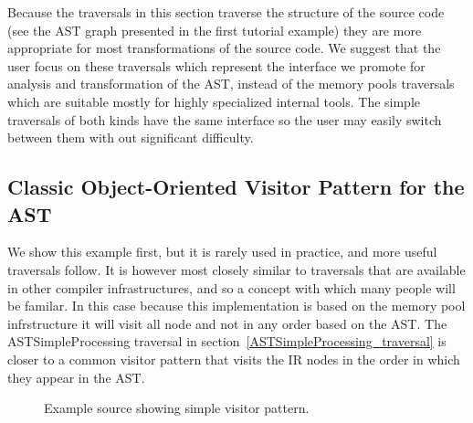    Because the traversals in this section traverse the structure of
the source code (see the AST graph presented in the first tutorial 
example) they are more appropriate for most transformations
of the source code.  We suggest that the user focus on these 
traversals which represent the interface we promote for analysis
and transformation of the AST, instead of the memory pools traversals
which are suitable mostly for highly specialized internal tools.
The simple traversals of both kinds have the same interface so the user may
easily switch between them with out significant difficulty.

\subsection{Classic Object-Oriented Visitor Pattern for the AST}

   We show this example first, but it is rarely used in practice, and
more useful traversals follow.  It is however most closely similar to
traversals that are available in other compiler infrastructures, and so
a concept with which many people will be familar.  In this case because
this implementation is based on the memory pool infrstructure it will
visit all node and not in any order based on the AST.  The ASTSimpleProcessing
traversal in section~\ref{ASTSimpleProcessing_traversal} is closer to a common 
visitor pattern that visits the IR nodes in the order in which they appear in 
the AST.

\begin{figure}[!h]
{\indent
{\mySmallFontSize

\begin{latexonly}
   
\end{latexonly}

\begin{htmlonly}
   
\end{htmlonly}

}
}
\caption{Example source showing simple visitor pattern.}
\label{Tutorial:exampleClassicVisitorPattern}
\end{figure}


